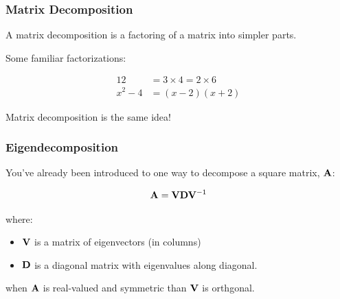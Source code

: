 \documentclass{beamer}
\begin{document}
\begin{frame}[fragile]
  \frametitle{Matrix Decomposition}

A matrix decomposition is a factoring of a matrix into simpler parts.

\medskip
Some familiar factorizations:

\begin{align*}
12 &= 3 \times 4 = 2 \times 6  \\
x^2 - 4 &= (x-2)(x+2)
\end{align*}


\begin{center}
   \alert{Matrix decomposition is the same idea!}
\end{center}



\end{frame}



\begin{frame}
  \frametitle{Eigendecomposition}


You've already been introduced to one way to decompose a square matrix, $\mathbf{A}$:

$$ \mathbf{A} = \mathbf{V}\mathbf{D}\mathbf{V}^{-1} $$

where:
\begin{itemize}
\item  $\mathbf{V}$ is a matrix of eigenvectors (in columns)
\item $\mathbf{D}$ is a diagonal matrix with eigenvalues along diagonal.
\end{itemize}

\medskip
when $\mathbf{A}$ is real-valued and symmetric than $\mathbf{V}$ is orthgonal.

\end{frame}
\end{document}
